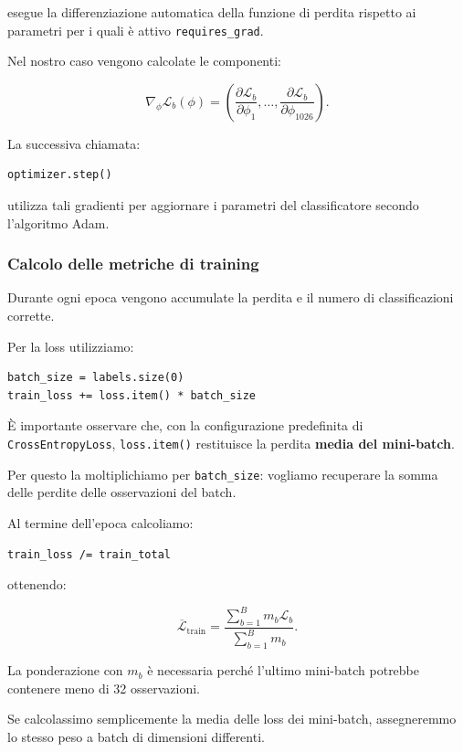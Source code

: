 \documentclass[10pt,a4paper,oneside]{book}
\begin{document}
esegue la differenziazione automatica della
funzione di perdita rispetto ai parametri
per i quali è attivo \texttt{requires\_grad}.

Nel nostro caso vengono calcolate le componenti:

\[
\nabla_\phi\mathcal{L}_b(\phi)
=
\left(
\frac{\partial\mathcal{L}_b}{\partial\phi_1},
\ldots,
\frac{\partial\mathcal{L}_b}{\partial\phi_{1026}}
\right).
\]

La successiva chiamata:

\begin{verbatim}
optimizer.step()
\end{verbatim}

utilizza tali gradienti per aggiornare i parametri
del classificatore secondo l'algoritmo Adam.

\subsubsection{Calcolo delle metriche di training}

Durante ogni epoca vengono accumulate la perdita
e il numero di classificazioni corrette.

Per la loss utilizziamo:

\begin{verbatim}
batch_size = labels.size(0)
train_loss += loss.item() * batch_size
\end{verbatim}

È importante osservare che, con la configurazione
predefinita di \texttt{CrossEntropyLoss},
\texttt{loss.item()} restituisce la perdita
\textbf{media del mini-batch}.

Per questo la moltiplichiamo per
\texttt{batch\_size}: vogliamo recuperare la
somma delle perdite delle osservazioni del batch.

Al termine dell'epoca calcoliamo:

\begin{verbatim}
train_loss /= train_total
\end{verbatim}

ottenendo:

\[
\overline{\mathcal{L}}_{\mathrm{train}}
=
\frac{
\displaystyle\sum_{b=1}^{B}
m_b\mathcal{L}_b
}{
\displaystyle\sum_{b=1}^{B}m_b
}.
\]

La ponderazione con $m_b$ è necessaria perché
l'ultimo mini-batch potrebbe contenere meno
di 32 osservazioni.

Se calcolassimo semplicemente la media delle
loss dei mini-batch, assegneremmo lo stesso peso
a batch di dimensioni differenti.
\end{document}
